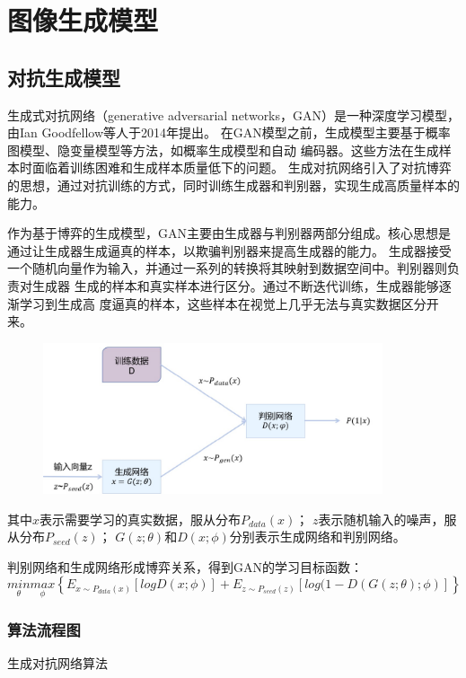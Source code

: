 \chapter{图像生成模型}
\label{cha:sysu-thesis-contents-format-requirement}

\section{对抗生成模型}
生成式对抗网络（generative adversarial networks，GAN）是一种深度学习模型，由Ian Goodfellow等人于2014年提出。
在GAN模型之前，生成模型主要基于概率图模型、隐变量模型等方法，如概率生成模型和自动
编码器。这些方法在生成样本时面临着训练困难和生成样本质量低下的问题。
生成对抗网络引入了对抗博弈的思想，通过对抗训练的方式，同时训练生成器和判别器，实现生成高质量样本的能力。

作为基于博弈的生成模型，GAN主要由生成器与判别器两部分组成。核心思想是通过让生成器生成逼真的样本，以欺骗判别器来提高生成器的能力。
生成器接受一个随机向量作为输入，并通过一系列的转换将其映射到数据空间中。判别器则负责对生成器
生成的样本和真实样本进行区分。通过不断迭代训练，生成器能够逐渐学习到生成高
度逼真的样本，这些样本在视觉上几乎无法与真实数据区分开来。

\begin{figure}[!htbp]
    \centering
    \includegraphics[width=10cm]{image/chap02/GAN.jpg}
    \label{fig:GAN}
\end{figure}

其中$x$表示需要学习的真实数据，服从分布$P_{data}(x)$；
$z$表示随机输入的噪声，服从分布$P_{seed}(z)$；
$G(z;\theta)和D(x;\phi)$分别表示生成网络和判别网络。

判别网络和生成网络形成博弈关系，得到GAN的学习目标函数：
$$\underset{\theta}{min}\underset{\phi}{max}\left\{E_{x\sim P_{data}(x)}[logD(x;\phi)]+E_{z\sim P_{seed}(z)}[log(1-D(G(z;\theta);\phi)]\right\}$$

\subsection{算法流程图}
\label{sec:algorithm}
\begin{algorithm}[h]
    
    \caption{生成对抗网络算法}
    \label{algo:sgd}
\end{algorithm}

